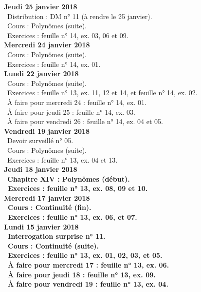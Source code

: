 \documentclass[12pt,a4paper]{article}
\begin{document}
\noindent\textbf{Jeudi 25 janvier 2018}\\
\bu\ Distribution : DM n° 11 (à rendre le 25 janvier).\\
\bu\ Cours : Polynômes (suite).\\
\bu\ Exercices : feuille n° 14, ex. 03, 06 et 09.\vspace{.4cm}\\

\noindent\textbf{Mercredi 24 janvier 2018} \\
\bu\ Cours : Polynômes (suite).\\
\bu\ Exercices : feuille n° 14, ex. 01.\vspace{.4cm}\\

\noindent\textbf{Lundi 22 janvier 2018} \\
\bu\ Cours : Polynômes (suite).\\
\bu\ Exercices : feuille n° 13, ex. 11, 12 et 14, et feuille n° 14, ex. 02.\\
\bu\ À faire pour mercredi 24 : feuille n° 14, ex. 01.\\
\bu\ À faire pour jeudi 25 : feuille n° 14, ex. 03.\\
\bu\ À faire pour vendredi 26 : feuille n° 14, ex. 04 et 05.\vspace{.4cm}\\

\noindent\textbf{Vendredi 19 janvier 2018}\\
\bu\ Devoir surveillé n° 05.\\
\bu\ Cours : Polynômes (suite).\\
\bu\ Exercices : feuille n° 13, ex. 04 et 13.\vspace{.4cm}\\

\noindent\textbf{Jeudi 18 janvier 2018}\\
\bu\ \bf Chapitre XIV \rm : Polynômes (début).\\
\bu\ Exercices : feuille n° 13, ex. 08, 09 et 10.\vspace{.4cm}\\

\noindent\textbf{Mercredi 17 janvier 2018} \\
\bu\ Cours : Continuité (fin).\\
\bu\ Exercices : feuille n° 13, ex. 06, et 07.\vspace{.4cm}\\

\noindent\textbf{Lundi 15 janvier 2018} \\
\bu\ Interrogation surprise n° 11.\\
\bu\ Cours : Continuité (suite).\\
\bu\ Exercices : feuille n° 13, ex. 01, 02, 03, et 05.\\
\bu\ À faire pour mercredi 17 : feuille n° 13, ex. 06.\\
\bu\ À faire pour jeudi 18 : feuille n° 13, ex. 09.\\
\bu\ À faire pour vendredi 19 : feuille n° 13, ex. 04.\vspace{.4cm}\\
\end{document}
